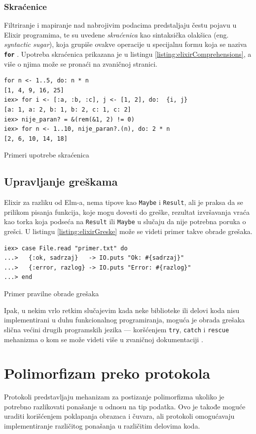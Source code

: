 \documentclass[12pt,oneside]{memoir}
\begin{document}
\subsubsection{Skraćenice}
Filtriranje i mapiranje nad nabrojivim podacima predstaljaju čestu pojavu u Elixir programima,
te su uvedene \emph{skraćenica} kao sintaksička olakšica (eng. \emph{syntactic sugar}), koja
grupiše ovakve operacije u specijalnu formu koja se naziva \texttt{\textbf{for}} . Upotreba skraćenica
prikazana je u listingu \ref{listing:elixirComprehensions}, a više o njima može se pronaći na zvaničnoj
\cite{elixir} stranici.
\begin{listing}[!ht]
\begin{verbatim}
for n <- 1..5, do: n * n
[1, 4, 9, 16, 25]
iex> for i <- [:a, :b, :c], j <- [1, 2], do:  {i, j}
[a: 1, a: 2, b: 1, b: 2, c: 1, c: 2]
iex> nije_paran? = &(rem(&1, 2) != 0)
iex> for n <- 1..10, nije_paran?.(n), do: 2 * n
[2, 6, 10, 14, 18]
\end{verbatim}
\caption{Primeri upotrebe skraćenica}
\label{listing:elixirComprehensions}
\end{listing}
\subsection{Upravljanje greškama}
Elixir za razliku od Elm-a, nema tipove kao \texttt{Maybe} i \texttt{Result}, ali je praksa
da se prilikom pisanja funkcija, koje mogu dovesti do greške, rezultat izvršavanja vraća kao
torka koja podseća na \texttt{Result} ili \texttt{Maybe} u slučaju da nije potrebna poruka o
grešci. U listingu \ref{listing:elixirGreske} može se videti primer takve obrade grešaka.
\begin{listing}[!ht]
\begin{verbatim}
iex> case File.read "primer.txt" do
...>   {:ok, sadrzaj}   -> IO.puts "Ok: #{sadrzaj}"
...>   {:error, razlog} -> IO.puts "Error: #{razlog}"
...> end
\end{verbatim}
\caption{Primer pravilne obrade grešaka}
\label{listing:elixirGreske}
\end{listing}
Ipak, u nekim vrlo retkim slučajevim kada neke biblioteke ili delovi koda nisu implementirani
u duhu funkcionalnog programiranja, moguća je obrada grešaka slična većini drugih programskih
jezika --- koršćenjem \texttt{try}, \texttt{catch} i \texttt{rescue} mehanizma o kom se može
videti više u zvaničnoj dokumentaciji \cite{elixir}.
\section{Polimorfizam preko protokola}
Protokoli predstavljaju mehanizam za postizanje polimorfizma ukoliko je potrebno razlikovati
ponašanje u odnosu na tip podatka. Ovo je takođe moguće uraditi korišćenjem poklapanja
obrazaca i čuvara, ali protokoli omogućavaju implementiranje različitog ponašanja u
različitim delovima koda.
\end{document}
